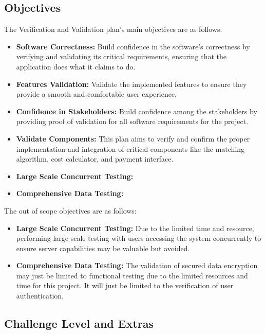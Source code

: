 \documentclass[12pt, titlepage]{article}
\begin{document}
\subsection{Objectives}
The Verification and Validation plan's main objectives are as follows: 
\begin{itemize}
    \item \textbf{Software Correctness:} Build confidence in the software's correctness by verifying and validating its critical requirements, ensuring that the application does what it claims to do. 
    \item \textbf{Features Validation:} Validate the implemented features to ensure they provide a smooth and comfortable user experience. 
    \item \textbf{Confidence in Stakeholders:} Build confidence among the stakeholders by providing proof of validation for all software requirements for the project.  
    \item \textbf{Validate Components:} This plan aims to verify and confirm the proper implementation and integration of critical components like the matching algorithm, cost calculator, and payment interface. 
    \item \textbf{Large Scale Concurrent Testing:}
    \item \textbf{Comprehensive Data Testing:}
\end{itemize}
The out of scope objectives are as follows:
\begin{itemize}
    \item \textbf{Large Scale Concurrent Testing:} Due to the limited time and resource, performing large scale testing with users accessing the system concurrently to ensure server capabilities may be valuable but avoided.  
    \item \textbf{Comprehensive Data Testing:} The validation of secured data encryption may just be limited to functional testing due to the limited resources and time for this project. It will just be limited to the verification of user authentication. 
\end{itemize}

\subsection{Challenge Level and Extras}

\end{document}
